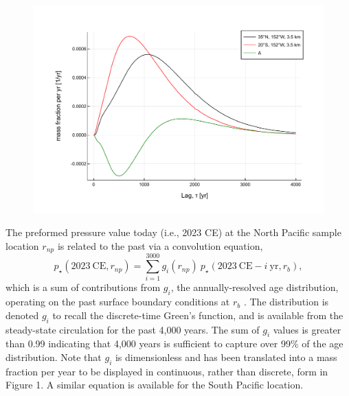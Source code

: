 \documentclass[12pt]{article}
\begin{document}
\begin{figure}[htbp]
 \begin{center}
 \includegraphics[scale=0.9]{../plots/deltaresponse_NPACvSPAC.pdf} \\
 \end{center} 
\end{figure}

The preformed pressure value today (i.e., 2023 CE) at the North
Pacific sample location $r_{np}$ is related to the past via a
convolution equation,
\begin{equation}
\label{eq:2}
p_{\star}(2023~ \mathrm{CE}, r_{np}) = \sum_{i=1}^{3000} g_i(r_{np})~  p_{\star}(2023~ \mathrm{CE} - i~\mathrm{yr}, r_{b}),
\end{equation}
which is a sum of contributions from $g_i$, the annually-resolved age
distribution, operating on the past surface boundary conditions at
$r_b$ \cite{Hall-Haine-2002:ocean}.  The distribution is denoted $g_i$
to recall the discrete-time Green's function, and is available from
the steady-state circulation for the past 4,000 years. The sum of
$g_i$ values is greater than 0.99 indicating that 4,000 years is
sufficient to capture over 99\% of the age distribution. Note that
$g_{i}$ is dimensionless and has been translated into a mass fraction
per year to be displayed in continuous, rather than discrete, form in
Figure 1. A similar equation is available for the South Pacific
location.
\end{document}

